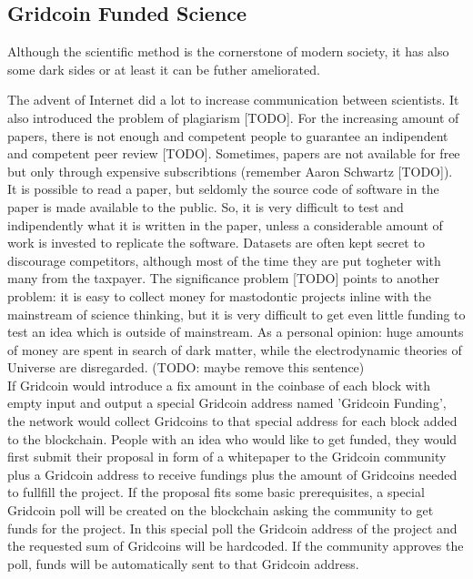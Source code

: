 \subsection{Gridcoin Funded Science}

Although the scientific method is the cornerstone of modern society, it has also some dark sides or at least it can be futher ameliorated. 

The advent of Internet did a lot to increase communication between scientists. It also introduced the problem of plagiarism [TODO]. For the increasing amount of papers, there is not enough and competent people to guarantee an indipendent and competent peer review [TODO]. Sometimes, papers are not available for free but only through expensive subscribtions (remember Aaron Schwartz [TODO]). It is possible to read a paper, but seldomly the source code of software in the paper is made available to the public. So, it is very difficult to test and indipendently what it is written in the paper, unless a considerable amount of work is invested to replicate the software. Datasets are often kept secret to discourage competitors, although most of the time they are put togheter with many from the taxpayer. The significance problem [TODO] points to another problem: it is easy to collect money for mastodontic projects inline with the mainstream of science thinking, but it is very difficult to get even little funding to test an idea which is outside of mainstream. As a personal opinion: huge amounts of money are spent in search of dark matter, while the electrodynamic theories of Universe are disregarded. (TODO: maybe remove this sentence)\\

If Gridcoin would introduce a fix amount in the coinbase of each block with empty input and output a special Gridcoin address named 'Gridcoin Funding', the network would collect Gridcoins to that special address for each block added to the blockchain. People with an idea who would like to get funded, they would first submit their proposal in form of a whitepaper to the Gridcoin community plus a Gridcoin address to receive fundings plus the amount of Gridcoins needed to fullfill the project. If the proposal fits some basic prerequisites, a special Gridcoin poll will be created on the blockchain asking the community to get funds for the project. In this special poll the Gridcoin address of the project and the requested sum of Gridcoins will be hardcoded. If the community approves the poll, funds will be automatically sent to that Gridcoin address.\\

